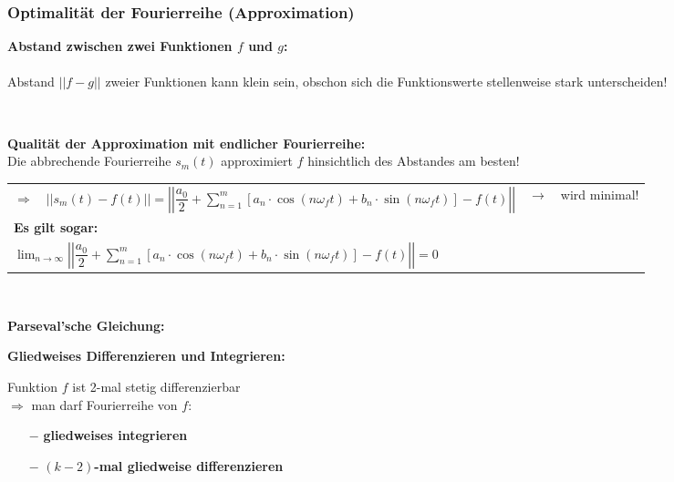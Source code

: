 			\subsubsection{Optimalität der Fourierreihe (Approximation)}
				\begin{minipage}[b]{0.55\textwidth}
					\textbf{Abstand zwischen zwei Funktionen $f$ und $g$:}\\[3pt]
					\\[3pt]
					Abstand $||f - g||$ zweier Funktionen kann klein sein, obschon sich die Funktionswerte stellenweise stark unterscheiden!
				\end{minipage}
				\begin{minipage}[]{0.45\textwidth}
					\scalebox{0.8}{}\\[3pt]
				\end{minipage}
				\textbf{Qualität der Approximation mit endlicher Fourierreihe:}\\[3pt]
				Die abbrechende Fourierreihe $s_m(t)$ approximiert $f$ hinsichtlich des Abstandes am besten!\\[3pt]
				\begin{tabular}{|lll|}
					\hline
					$\Rightarrow \quad \displaystyle \left|\left|s_m(t) - f(t)\right|\right| = \left|\left|\dfrac{a_0}{2} + \sum\limits_{n=1}^{m} [a_n \cdot \cos(n \omega_f t) + b_n \cdot \sin(n \omega_f t)] - f(t)\right|\right|$ & $\rightarrow$ & wird minimal!\\[3pt]
					\textbf{Es gilt sogar:} & &\\[3pt]
					$\displaystyle \lim_{n \to \infty} \left|\left|\dfrac{a_0}{2} + \sum\limits_{n=1}^{m} [a_n \cdot \cos(n \omega_f t) + b_n \cdot \sin(n \omega_f t)] - f(t)\right|\right| = 0$ & &\\[3pt]
					\hline
				\end{tabular}\\[3pt]
				\begin{minipage}[t]{0.5\textwidth}
					\textbf{Parseval’sche Gleichung:}\\[3pt]
				\end{minipage}
				\begin{minipage}[t]{0.5\textwidth}
					\textbf{Gliedweises Differenzieren und Integrieren:}
					\begin{framed}
						Funktion $f$ ist 2-mal stetig differenzierbar\\[3pt]
						$\Rightarrow$ man darf Fourierreihe von $f$:
						\begin{itemize}
							\item[$-$] \textbf{gliedweises integrieren}
							\item[$-$] \textbf{$(k-2)$-mal gliedweise differenzieren}
				 		\end{itemize}
					\end{framed}
				\end{minipage}
